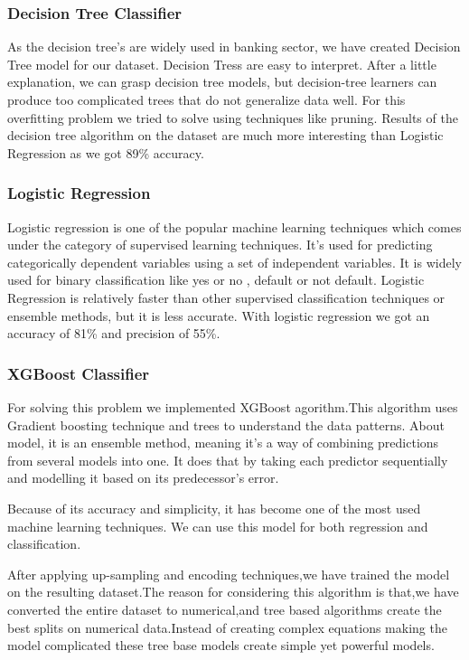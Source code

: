 \documentclass[12pt]{article}
\begin{document}
\subsubsection{Decision Tree Classifier}
As the decision tree's are widely used in banking sector, we have created Decision Tree model for our dataset. Decision Tress are easy to interpret. After a little explanation, we can grasp decision tree models, but decision-tree learners can produce too complicated trees that do not generalize data well. For this overfitting problem we tried to solve using techniques like pruning.
Results of the decision tree algorithm on the dataset are much more interesting than Logistic Regression as we got 89\% accuracy.

\subsubsection{Logistic Regression}
Logistic regression is one of the popular machine learning techniques which comes under the category of supervised learning techniques. It’s used for predicting categorically dependent variables using a set of independent variables. It is widely used for binary classification like yes or no , default or not default. Logistic Regression is relatively faster than other supervised classification techniques or ensemble methods, but it is less accurate. With logistic regression we got an accuracy of 81\% and precision of 55\%.

\subsubsection{XGBoost Classifier}
For solving this problem we implemented XGBoost agorithm.This algorithm uses Gradient boosting technique and trees to understand the data patterns. About model, it is an  ensemble method, meaning it’s a way of combining predictions from several models into one. It does that by taking each predictor sequentially and modelling it based on its predecessor’s error.

Because of its accuracy and simplicity, it has become one of the most used machine learning techniques. We can use this model for both regression and classification.

After applying up-sampling and encoding techniques,we have trained the model on the resulting dataset.The reason for considering this algorithm is that,we have converted the entire dataset to numerical,and tree based algorithms create the best splits on numerical data.Instead of creating complex equations making the model complicated these tree base models create simple yet powerful models.
\end{document}
